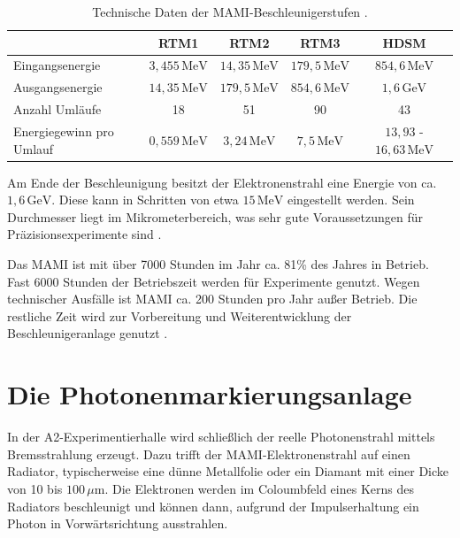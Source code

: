 \documentclass[a4paper,11pt,oneside,final,german,openbib,pdftex]{scrbook}
\begin{document}
{\begin{table}[h!]
		\begin{tabular}{p{3cm}cccc}
		
			& RTM1 & RTM2 & RTM3 & HDSM \\

			\hline
			Eingangsenergie &$3,455\, \text{MeV}$  &  $14,35\, \text{MeV}$& $179,5\, \text{MeV}$  &$854,6\, \text{MeV}$ \\
			Ausgangsenergie &$14,35 \,\text{MeV}$  &  $179,5\, \text{MeV} $&$854,6\,\text{MeV}$  & $1,6\,\text{GeV}$ \\ 
			Anzahl Uml\"aufe&18  &51  &90  &43 \\ 
			Energiegewinn  
			pro Umlauf &$0,559\, \text{MeV}$  & $3,24\, \text{MeV}$ &$7,5 \,\text{MeV}$  & $13,93$ - $16,63 \,\text{MeV}$ \\ 
			
	
		\end{tabular}

		\caption[Technische Daten der Mamibeschleunigerstufen]{Technische Daten der MAMI-Beschleunigerstufen \cite{Un08}.}
		\label{tab.MAMIstufen}

\end{table}

 Am Ende der Beschleunigung besitzt der Elektronenstrahl eine Energie von ca. $1,6 \,\text{GeV}$. Diese kann in Schritten von etwa $15\,\text{MeV}$ eingestellt werden. Sein Durchmesser liegt im Mikrometerbereich, was sehr gute Voraussetzungen f\"ur Pr\"azisionsexperimente sind \cite{KPh07}. 
 
 Das MAMI ist mit \"uber 7000 Stunden im Jahr ca. 81\% des Jahres in Betrieb. Fast 6000 Stunden der Betriebszeit werden f\"ur Experimente genutzt. Wegen technischer Ausf\"alle ist MAMI ca. 200 Stunden pro Jahr au{\ss}er Betrieb. Die restliche Zeit wird zur Vorbereitung und Weiterentwicklung der Beschleunigeranlage genutzt \cite{KPh11B}.
 
 
 \section{Die Photonenmarkierungsanlage}
 
 In der A2-Experimentierhalle wird schlie{\ss}lich der reelle Photonenstrahl mittels Bremsstrahlung erzeugt. Dazu trifft der MAMI-Elektronenstrahl auf einen Radiator, typischerweise eine d\"unne Metallfolie oder ein Diamant mit einer Dicke von 10 bis $100\, \mu\text{m}$. Die Elektronen werden im Coloumbfeld eines Kerns des Radiators beschleunigt und k\"onnen dann, aufgrund der Impulserhaltung ein Photon in Vorw\"artsrichtung ausstrahlen.
 
}
\end{document}
